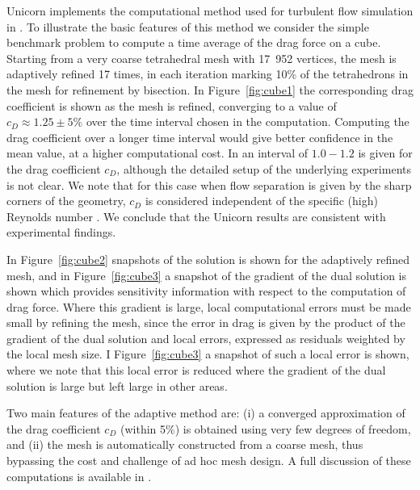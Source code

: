 Unicorn implements the computational
method used for turbulent flow simulation in
\citet{Hoffman2005,HoffmanJohnson2006b,Hoffman2006,Hoffman2009,HoffmanJansson2009,VilelaJanssonEtAl2010}.
To illustrate the basic features of this method we consider the simple
benchmark problem to compute a time average of the drag force on a
cube. Starting from a very coarse tetrahedral mesh with 17~952 vertices,
the mesh is adaptively refined 17 times, in each iteration marking
10\% of the tetrahedrons in the mesh for refinement by bisection. In
Figure~\ref{fig:cube1} the corresponding drag coefficient is shown as
the mesh is refined, converging to a value of $c_D\approx 1.25\pm 5\%$
over the time interval chosen in the computation. Computing the drag
coefficient over a longer time interval would give better confidence in
the mean value, at a higher computational cost. In \citet{Mccormick1995}
an interval of $1.0-1.2$ is given for the drag coefficient $c_D$, although
the detailed setup of the underlying experiments is not clear. We note
that for this case when flow separation is given by the sharp corners
of the geometry, $c_D$ is considered independent of the specific (high)
Reynolds number \citep{Mccormick1995}.  We conclude that the Unicorn
results are consistent with experimental findings.

In Figure~\ref{fig:cube2} snapshots of the solution is shown for the
adaptively refined mesh, and in Figure~\ref{fig:cube3} a snapshot of
the gradient of the dual solution is shown which provides sensitivity
information with respect to the computation of drag force. Where this
gradient is large, local computational errors must be made small by
refining the mesh, since the error in drag is given by the product of the
gradient of the dual solution and local errors, expressed as residuals
weighted by the local mesh size. I Figure~\ref{fig:cube3} a snapshot
of such a local error is shown, where we note that this local error is
reduced where the gradient of the dual solution is large but left large
in other areas.

Two main features of the adaptive method are: (i) a converged
approximation of the drag coefficient $c_D$ (within 5\%) is obtained
using very few degrees of freedom, and (ii) the mesh is automatically
constructed from a coarse mesh, thus bypassing the cost and challenge of
ad hoc mesh design. A full discussion of these computations is available
in \citet{HoffmanJansson2011}.

